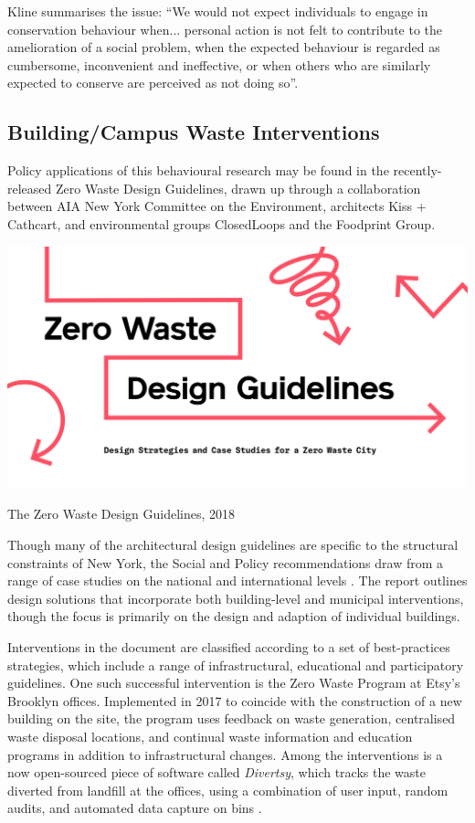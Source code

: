 \documentclass[nofonts,nols,justified,nobib]{tufte-book}
\begin{document}
Kline \cite{kline_rationalizing_1988} summarises the issue: ``We would not expect individuals to engage in conservation behaviour when... personal action is not felt to contribute to the amelioration of a social problem, when the expected behaviour is regarded as cumbersome, inconvenient and ineffective, or when others who are similarly expected to conserve are perceived as not doing so''.

\subsection*{Building/Campus Waste Interventions}
Policy applications of this behavioural research may be found in the recently-released Zero Waste Design Guidelines, drawn up through a collaboration between AIA New York Committee on the Environment, architects Kiss + Cathcart, and environmental groups ClosedLoops and the Foodprint Group.
\begin{marginfigure}
\includegraphics[width=\textwidth]{img/1/zero-waste-guidelines.png}
\caption{The Zero Waste Design Guidelines, 2018 \cite{aia_new_york_zero_2017}}
\end{marginfigure}
Though many of the architectural design guidelines are specific to the structural constraints of New York, the Social and Policy recommendations draw from a range of case studies on the national and international levels \cite{aia_new_york_zero_2017}. The report outlines design solutions that incorporate both building-level and municipal interventions, though the focus is primarily on the design and adaption of individual buildings.

Interventions in the document are classified according to a set of best-practices strategies, which include a range of infrastructural, educational and participatory guidelines. One such successful intervention is the Zero Waste Program at Etsy's Brooklyn offices. Implemented in 2017 to coincide with the construction of a new building on the site, the program uses feedback on waste generation, centralised waste disposal locations, and continual waste information and education programs in addition to infrastructural changes. Among the interventions is a now open-sourced piece of software called \emph{Divertsy}, which tracks the waste diverted from landfill at the offices, using a combination of user input, random audits, and automated data capture on bins \cite{benninger_divertsy_2019}.
\end{document}
